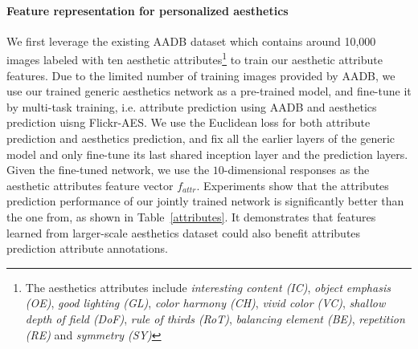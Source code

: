 \paragraph{Feature representation for personalized aesthetics}
We first leverage the existing AADB\cite{kong2016photo} dataset which contains around 10,000 images labeled with ten aesthetic attributes\footnote{The aesthetics attributes include \textsl{interesting content (IC)}, \textsl{object emphasis (OE)}, \textsl{good lighting (GL)}, \textsl{color harmony (CH)}, \textsl{vivid color (VC)}, \textsl{shallow depth of field (DoF)}, \textsl{rule of thirds (RoT)}, \textsl{balancing element (BE)}, \textsl{repetition (RE)} and \textsl{symmetry (SY)} } to train our aesthetic attribute features. Due to the limited number of training images provided by AADB, we use our trained generic aesthetics network as a pre-trained model, and fine-tune it by multi-task training, i.e. attribute prediction using AADB and aesthetics prediction uisng Flickr-AES. We use the Euclidean loss for both attribute prediction and aesthetics prediction, and fix all the earlier layers of the generic model and only fine-tune its last shared inception layer and the prediction layers. Given the fine-tuned network, we use the $10$-dimensional responses as the aesthetic attributes feature vector $f_{attr}$. Experiments show that the attributes prediction performance of our jointly trained network is significantly better than the one from\cite{kong2016photo}, as shown in Table~\ref{attributes}. It demonstrates that features learned from larger-scale aesthetics dataset could also benefit attributes prediction attribute annotations.

